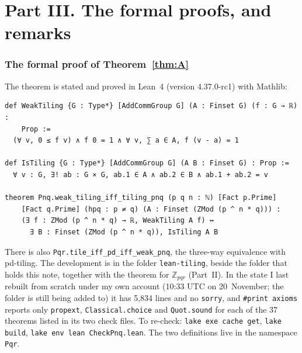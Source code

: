 \documentclass[11pt,a4paper]{amsart}
\theoremstyle{definition}
\theoremstyle{remark}
\newcommand{\Z}{\mathbb{Z}}
\newcommand{\lean}[1]{\texttt{#1}}
\begin{document}
\part*{Part III. The formal proofs, and remarks}

\section{The formal proof of Theorem~\ref{thm:A}}\label{Y:sec:lean}

The theorem is stated and proved in Lean~4 (version 4.37.0-rc1) with Mathlib:
\begin{verbatim}
def WeakTiling {G : Type*} [AddCommGroup G] (A : Finset G) (f : G → ℝ) :
    Prop :=
  (∀ v, 0 ≤ f v) ∧ f 0 = 1 ∧ ∀ v, ∑ a ∈ A, f (v - a) = 1

def IsTiling {G : Type*} [AddCommGroup G] (A B : Finset G) : Prop :=
  ∀ v : G, ∃! ab : G × G, ab.1 ∈ A ∧ ab.2 ∈ B ∧ ab.1 + ab.2 = v

theorem Pnq.weak_tiling_iff_tiling_pnq (p q n : ℕ) [Fact p.Prime]
    [Fact q.Prime] (hpq : p ≠ q) (A : Finset (ZMod (p ^ n * q))) :
    (∃ f : ZMod (p ^ n * q) → ℝ, WeakTiling A f) ↔
      ∃ B : Finset (ZMod (p ^ n * q)), IsTiling A B
\end{verbatim}
There is also \lean{Pqr.tile\_iff\_pd\_iff\_weak\_pnq}, the three-way equivalence with pd-tiling. The
development is in the folder \lean{lean-tiling}, beside the folder that holds this note, together with the theorem for
$\Z_{pqr}$ (Part~II). In the state I last rebuilt from scratch under my own account (10:33 UTC on
20~November; the folder is still being added to) it has 5{,}834 lines and no \lean{sorry}, and
\lean{\#print axioms} reports only \lean{propext}, \lean{Classical.choice} and \lean{Quot.sound} for each of the
37 theorems listed in its two check files. To re-check: \lean{lake exe cache get}, \lean{lake build},
\lean{lake env lean CheckPnq.lean}. The two definitions live in the namespace \lean{Pqr}.
\end{document}
